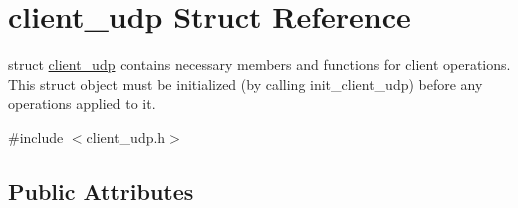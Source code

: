 \hypertarget{structclient__udp}{}\section{client\+\_\+udp Struct Reference}
\label{structclient__udp}


struct \hyperlink{structclient__udp}{client\+\_\+udp} contains necessary members and functions for client operations. This struct object must be initialized (by calling init\+\_\+client\+\_\+udp) before any operations applied to it.  




{\ttfamily \#include $<$client\+\_\+udp.\+h$>$}

\subsection*{Public Attributes}
